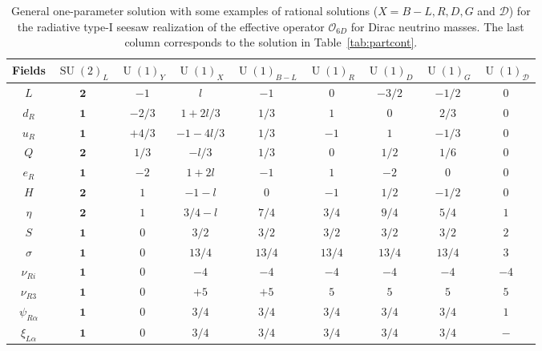 \documentclass[12pt]{article}
\begin{document}
%
\begin{table}
  \centering
  \begin{tabular}{|c|c|c|c|c|c|c|c||c|}
    \hline  
    Fields     & $\operatorname{SU}(2)_L$ &  $\operatorname{U}(1)_Y $ & $\operatorname{U}(1)_{X}$& $\operatorname{U}(1)_{B-L}$& $\operatorname{U}(1)_R$& $\operatorname{U}(1)_D$& $\operatorname{U}(1)_G$ & $\operatorname{U}(1)_{\mathcal{D}}$\\ \hline
$L $     & $\boldsymbol{2}$ & $-1$ & $l$      &  $-1$&    $0$ &  $-3/2$&  $-1/2$ & $0$ \\    
$d_R $   & $\boldsymbol{1}$ & $-2/3$ & $1+2l/3$ &  $1/3$&    $1$&  $0$&    $2/3$ & $0$\\
$u_R $   & $\boldsymbol{1}$ & $+4/3$ & $-1-4l/3$&  $1/3$&   $-1$&  $1$&   $-1/3$ & $0$ \\
$Q $     & $\boldsymbol{2}$ & $1/3$ & $-l/3$   & $1/3$&    $0$&  $1/2$&  $1/6$ & $0$ \\
$e_R $   & $\boldsymbol{1}$ & $-2$   & $1+2l$   &  $-1$&    $1$ &  $-2$&  $0$ & $0$\\\hline
$H $     & $\boldsymbol{2}$ & $1$  & $-1-l$   &  $0$&    $-1$ &  $1/2$&  $-1/2$ & $0$ \\
$\eta$   & $\boldsymbol{2}$ & $1$ & $3/4-l$  & $7/4$& $3/4$ &$9/4$&$5/4$ & $1$ \\
$S$      & $\boldsymbol{1}$ & $0$    & $3/2$    & $3/2$&  $3/2$ & $3/2$& $3/2$ & $2$\\
$\sigma$ & $\boldsymbol{1}$ & $0$    & $13/4$   & $13/4$&  $13/4$ & $13/4$& $13/4$ & $3$\\\hline
$\nu_{Ri}$& $\boldsymbol{1}$ & $0$   & $-4$& $-4$&  $-4$ & $-4$& $-4$ & $-4$\\
$\nu_{R3}$& $\boldsymbol{1}$ & $0$   & $+5$& $+5$&  $5$ & $5$& $5$ & $5$\\
$\psi_{R\alpha}$  & $\boldsymbol{1}$ & $0$& $3/4$ & $3/4$&  $3/4$ & $3/4$& $3/4$ & $1$ \\\hline
$\xi_{L\alpha}$   & $\boldsymbol{1}$ & $0$ & $3/4$& $3/4$ &  $3/4$ & $3/4$& $3/4$ &$-$\\\hline
  \end{tabular}
  \caption{General one-parameter solution with some examples of rational solutions
    ($X=B-L,R,D,G$ and $\mathcal{D}$) for the radiative type-I seesaw realization
    of the effective operator $\mathcal{O}_{6D}$ for Dirac neutrino masses. The
    last column  corresponds to the solution in Table~\ref{tab:partcont}.}
    \label{tab:partcont3}
\end{table}
\end{document}
